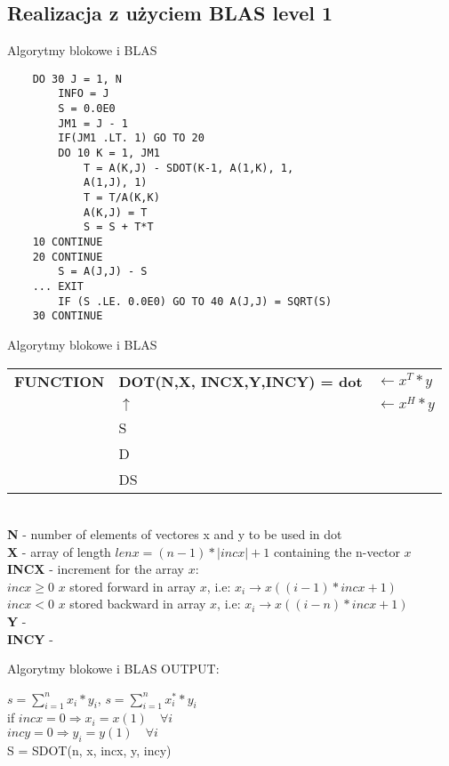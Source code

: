 	\subsection{Realizacja z użyciem BLAS level 1}
	\begin{frame}[fragile]{Algorytmy blokowe i BLAS}
		\begin{lstlisting}
    DO 30 J = 1, N		
        INFO = J
        S = 0.0E0
        JM1 = J - 1
        IF(JM1 .LT. 1) GO TO 20
        DO 10 K = 1, JM1
            T = A(K,J) - SDOT(K-1, A(1,K), 1,
            A(1,J), 1)
            T = T/A(K,K)
            A(K,J) = T
            S = S + T*T
    10 CONTINUE
    20 CONTINUE
        S = A(J,J) - S
    ... EXIT
        IF (S .LE. 0.0E0) GO TO 40 A(J,J) = SQRT(S)
    30 CONTINUE		
		\end{lstlisting}
	\end{frame}
	\begin{frame}{Algorytmy blokowe i BLAS}
		\begin{tabular}{ l l l }
			\textbf{FUNCTION} & \textunderscore \textbf{DOT(N,X, INCX,Y,INCY) = dot} & $ \leftarrow x^T * y $ \\
			   & $\uparrow$ & $ \leftarrow x^H * y $ \\
			   & S &  \\
			   & D & \\
			   & DS & \\
		\end{tabular} \\ 
		\textbf{N} - number of elements of vectores x and y to be used in dot \\
		\textbf{X} - array of length $lenx = (n - 1) * |inc x| + 1$ containing the n-vector $x$ \\
		\textbf{INCX} - increment for the array $x$: \\
		$\textit{incx} \geq 0 $ $x$ stored forward in array $x$, i.e: $x_i \rightarrow x((i - 1) * incx + 1)$ \\
		$\textit{incx} < 0$ $x$ stored backward in array $x$, i.e: $x_i \rightarrow x((i - n) * incx + 1)$ \\
		\textbf{Y} - \\
		\textbf{INCY} - \\
	\end{frame}
	\begin{frame}{Algorytmy blokowe i BLAS}
		OUTPUT: \\
		\begin{center}
			$s = \sum_{i=1}^n x_i * y_i$, $s = \sum_{i=1}^n x_i^{*} * y_i$ \\
			\vspace{5mm}
			if \quad $incx = 0 \Rightarrow x_i = x(1) \quad \forall i$ \\
			\quad $incy = 0 \Rightarrow y_i = y(1) \quad \forall i$ \\
			\vspace{5mm}
			S = SDOT(n, x, incx, y, incy)
		\end{center}
	\end{frame}

